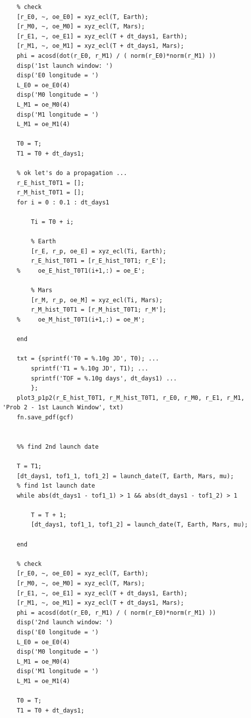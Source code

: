 \documentclass[conf]{new-aiaa}
\begin{document}
\begin{lstlisting}
    % check 
    [r_E0, ~, oe_E0] = xyz_ecl(T, Earth); 
    [r_M0, ~, oe_M0] = xyz_ecl(T, Mars); 
    [r_E1, ~, oe_E1] = xyz_ecl(T + dt_days1, Earth); 
    [r_M1, ~, oe_M1] = xyz_ecl(T + dt_days1, Mars); 
    phi = acosd(dot(r_E0, r_M1) / ( norm(r_E0)*norm(r_M1) ))
    disp('1st launch window: ')
    disp('E0 longitude = ') 
    L_E0 = oe_E0(4)
    disp('M0 longitude = ') 
    L_M1 = oe_M0(4)
    disp('M1 longitude = ') 
    L_M1 = oe_M1(4)
    
    T0 = T; 
    T1 = T0 + dt_days1; 
    
    % ok let's do a propagation ... 
    r_E_hist_T0T1 = []; 
    r_M_hist_T0T1 = []; 
    for i = 0 : 0.1 : dt_days1
        
        Ti = T0 + i; 
        
        % Earth 
        [r_E, r_p, oe_E] = xyz_ecl(Ti, Earth); 
        r_E_hist_T0T1 = [r_E_hist_T0T1; r_E']; 
    %     oe_E_hist_T0T1(i+1,:) = oe_E'; 
        
        % Mars 
        [r_M, r_p, oe_M] = xyz_ecl(Ti, Mars); 
        r_M_hist_T0T1 = [r_M_hist_T0T1; r_M']; 
    %     oe_M_hist_T0T1(i+1,:) = oe_M'; 
        
    end 
    
    txt = {sprintf('T0 = %.10g JD', T0); ... 
        sprintf('T1 = %.10g JD', T1); ... 
        sprintf('TOF = %.10g days', dt_days1) ... 
        }; 
    plot3_p1p2(r_E_hist_T0T1, r_M_hist_T0T1, r_E0, r_M0, r_E1, r_M1, 'Prob 2 - 1st Launch Window', txt)
    fn.save_pdf(gcf)
    
    
    %% find 2nd launch date 
    
    T = T1;
    [dt_days1, tof1_1, tof1_2] = launch_date(T, Earth, Mars, mu); 
    % find 1st launch date 
    while abs(dt_days1 - tof1_1) > 1 && abs(dt_days1 - tof1_2) > 1
    
        T = T + 1; 
        [dt_days1, tof1_1, tof1_2] = launch_date(T, Earth, Mars, mu); 
        
    end 
    
    % check 
    [r_E0, ~, oe_E0] = xyz_ecl(T, Earth); 
    [r_M0, ~, oe_M0] = xyz_ecl(T, Mars); 
    [r_E1, ~, oe_E1] = xyz_ecl(T + dt_days1, Earth); 
    [r_M1, ~, oe_M1] = xyz_ecl(T + dt_days1, Mars); 
    phi = acosd(dot(r_E0, r_M1) / ( norm(r_E0)*norm(r_M1) ))
    disp('2nd launch window: ')
    disp('E0 longitude = ') 
    L_E0 = oe_E0(4)
    disp('M0 longitude = ') 
    L_M1 = oe_M0(4)
    disp('M1 longitude = ') 
    L_M1 = oe_M1(4)
    
    T0 = T; 
    T1 = T0 + dt_days1; 
    

\end{lstlisting}
\end{document}
